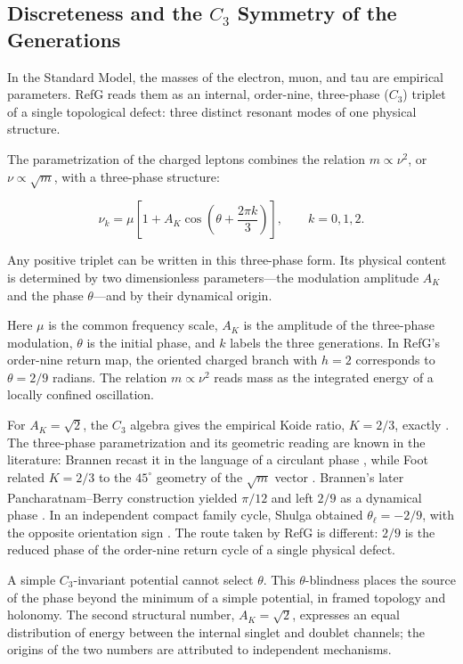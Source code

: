 \documentclass[11pt,a4paper]{article}
\begin{document}
\subsection{Discreteness and the \texorpdfstring{$C_3$}{C3} Symmetry of the Generations}

In the Standard Model, the masses of the electron, muon, and tau are empirical parameters. RefG reads them as an internal, order-nine, three-phase ($C_3$) triplet of a single topological defect: three distinct resonant modes of one physical structure.

The parametrization of the charged leptons combines the relation $m\propto\nu^2$, or $\nu\propto\sqrt m$, with a three-phase structure:

\begin{equation}
\nu_k=\mu\left[1+A_K\cos\left(\theta+\frac{2\pi k}{3}\right)\right],
\qquad k=0,1,2.
\label{eq:c3-triplet}
\end{equation}

Any positive triplet can be written in this three-phase form. Its physical content is determined by two dimensionless parameters---the modulation amplitude $A_K$ and the phase $\theta$---and by their dynamical origin.

Here $\mu$ is the common frequency scale, $A_K$ is the amplitude of the three-phase modulation, $\theta$ is the initial phase, and $k$ labels the three generations. In RefG's order-nine return map, the oriented charged branch with $h=2$ corresponds to $\theta=2/9$ radians. The relation $m\propto\nu^2$ reads mass as the integrated energy of a locally confined oscillation.

For $A_K=\sqrt2$, the $C_3$ algebra gives the empirical Koide ratio, $K=2/3$, exactly \citep{koide1982,koide1983}. The three-phase parametrization and its geometric reading are known in the literature: Brannen recast it in the language of a circulant phase \citep{brannen2006}, while Foot related $K=2/3$ to the $45^\circ$ geometry of the $\sqrt m$ vector \citep{foot1994}. Brannen's later Pancharatnam--Berry construction yielded $\pi/12$ and left $2/9$ as a dynamical phase \citep{brannen2010}. In an independent compact family cycle, Shulga obtained $\theta_\ell=-2/9$, with the opposite orientation sign \citep{shulga2026}. The route taken by RefG is different: $2/9$ is the reduced phase of the order-nine return cycle of a single physical defect.

A simple $C_3$-invariant potential cannot select $\theta$. This $\theta$-blindness places the source of the phase beyond the minimum of a simple potential, in framed topology and holonomy. The second structural number, $A_K=\sqrt2$, expresses an equal distribution of energy between the internal singlet and doublet channels; the origins of the two numbers are attributed to independent mechanisms.
\end{document}
